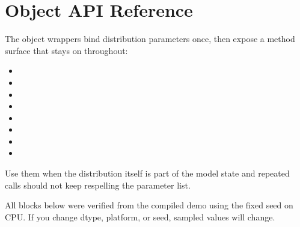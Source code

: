 \documentclass[letterpaper,10pt,english]{sphinxmanual}
\begin{document}
\chapter{Object API Reference}
\label{\detokenize{object_api_reference:object-api-reference}}\label{\detokenize{object_api_reference::doc}}
\sphinxAtStartPar
The object wrappers bind distribution parameters once, then expose a method surface that stays on  throughout:
\begin{itemize}
\item {} 
\sphinxAtStartPar
{}

\item {} 
\sphinxAtStartPar
{}

\item {} 
\sphinxAtStartPar
{}

\item {} 
\sphinxAtStartPar
{}

\item {} 
\sphinxAtStartPar
{}

\item {} 
\sphinxAtStartPar
{}

\item {} 
\sphinxAtStartPar
{}

\item {} 
\sphinxAtStartPar
{}

\end{itemize}

\sphinxAtStartPar
Use them when the distribution itself is part of the model state and repeated calls should not keep re\sphinxhyphen{}spelling the parameter list.

\sphinxAtStartPar
All  blocks below were verified from the compiled demo  using the fixed seed  on CPU. If you change dtype, platform, or seed, sampled values will change.


\section{}
\label{\detokenize{object_api_reference:normal}}
\end{document}
